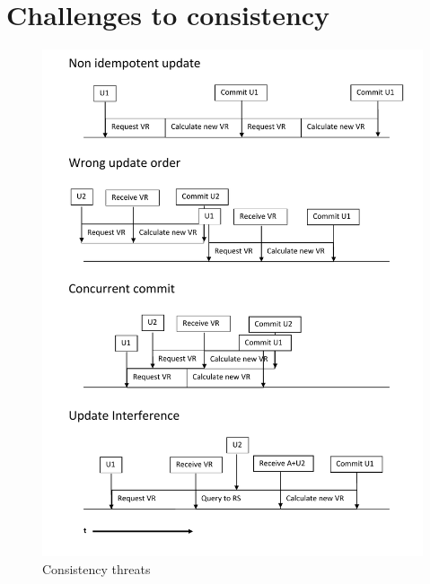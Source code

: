 \section{Challenges to consistency}
\begin{figure}[h!]
  \centering
    \includegraphics[scale=0.6]{figures/CO_ConsistencyProblems}
     \caption{Consistency threats}
    \label{fig:co_consistencyproblems}
\end{figure}
\newpage

